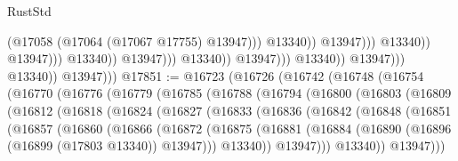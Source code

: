\begin{lexlean}{RustStd}
\begin{coremodule}
                                                                  (@17058
                                                                    (@17064
                                                                      (@17067 @17755)
                                                                      @13947)))
                                                                @13340))
                                                            @13947)))
                                                      @13340))
                                                  @13947)))
                                            @13340))
                                        @13947)))
                                  @13340))
                              @13947)))
                        @13340))
                    @13947)))
              @13340))
          @13947)))
@17851 := @16723
    (@16726
      (@16742
        (@16748
          (@16754
            (@16770
              (@16776
                (@16779
                  (@16785
                    (@16788
                      (@16794
                        (@16800
                          (@16803
                            (@16809
                              (@16812
                                (@16818
                                  (@16824
                                    (@16827
                                      (@16833
                                        (@16836
                                          (@16842
                                            (@16848
                                              (@16851
                                                (@16857
                                                  (@16860
                                                    (@16866
                                                      (@16872
                                                        (@16875
                                                          (@16881
                                                            (@16884
                                                              (@16890
                                                                (@16896
                                                                  (@16899 (@17803 @13340))
                                                                  @13947)))
                                                            @13340))
                                                        @13947)))
                                                  @13340))
                                              @13947)))

\end{coremodule}
\end{lexlean}
